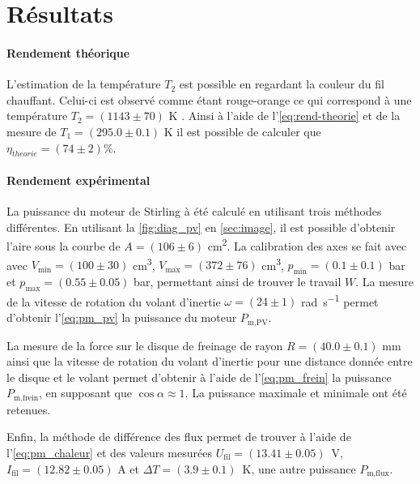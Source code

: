 \section{Résultats}

\paragraph*{Rendement théorique}
L'estimation de la température \(T_2\) est possible en regardant la couleur du fil chauffant. Celui-ci est observé comme étant rouge-orange ce qui correspond à une température \(T_2 = (1143 \pm 70)\) \si{\kelvin} \cite{temp-fil}. Ainsi à l'aide de l'\autoref{eq:rend-theorie} et de la mesure de \(T_1 = (295.0 \pm 0.1)\) \si{\kelvin} il est possible de calculer que \(\eta_{theorie} = (74 \pm 2)\)\%.

\paragraph*{Rendement expérimental}
La puissance du moteur de Stirling à été calculé en utilisant trois méthodes différentes. En utilisant la \autoref{fig:diag_pv} en \autoref{sec:image}, il est possible d'obtenir l'aire sous la courbe de \(A = (106 \pm 6)\) \si{\centi\meter\squared}. La calibration des axes se fait avec avec \(V_\textrm{min} = (100 \pm 30)\) \si{\centi\meter\cubed}, \(V_\textrm{max} = (372 \pm 76)\) \si{\centi\meter\cubed}, \(p_\textrm{min} = (0.1 \pm 0.1)\) \si{\bar} et \(p_\textrm{max} = (0.55 \pm 0.05)\) \si{\bar}, permettant ainsi de trouver le travail \(W\). La mesure de la vitesse de rotation du volant d'inertie \(\omega = (24 \pm 1)\) \si{\radian\per\second} permet d'obtenir l'\autoref{eq:pm_pv} la puissance du moteur \(P_\textrm{m,PV}\).

La mesure de la force sur le disque de freinage de rayon \(R = (40.0 \pm 0.1)\) \si{\milli\meter} ainsi que la vitesse de rotation du volant d'inertie pour une distance donnée entre le disque et le volant permet d'obtenir à l'aide de l'\autoref{eq:pm_frein} la puissance \(P_\textrm{m,frein}\), en supposant que \(\cos{\alpha} \approx 1\). La puissance maximale et minimale ont été retenues.

Enfin, la méthode de différence des flux permet de trouver à l'aide de l'\autoref{eq:pm_chaleur} et des valeurs mesurées \mbox{\(U_\textrm{fil} = (13.41 \pm 0.05)\) \si{\volt}}, \mbox{\(I_\textrm{fil} = (12.82 \pm 0.05)\)} \si{\ampere} et \mbox{\(\Delta T = (3.9 \pm 0.1)\) \si{\kelvin}}, une autre puissance \(P_\textrm{m,flux}\).

